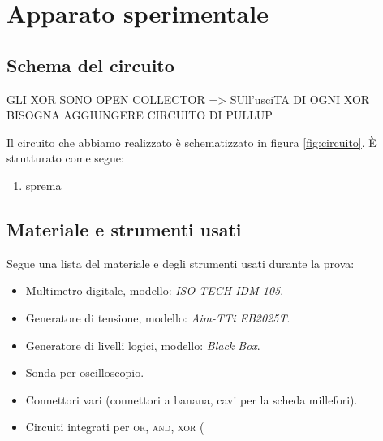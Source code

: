 \section{Apparato sperimentale}\label{sec:apparato-sperimentale}
\subsection{Schema del circuito}\label{subsec:schema-circuito}

GLI XOR SONO OPEN COLLECTOR => SUll'usciTA DI OGNI XOR BISOGNA AGGIUNGERE CIRCUITO DI PULLUP


Il circuito che abbiamo realizzato è schematizzato in figura \ref{fig:circuito}.
È strutturato come segue:
\begin{enumerate}
  \item%
  sprema %
\end{enumerate}

\subsection{Materiale e strumenti usati}\label{subsec:materiali}
Segue una lista del materiale e degli strumenti usati durante la prova:
\begin{itemize}
  \item%
  Multimetro digitale, modello: \emph{ISO-TECH IDM 105}.
  \item%
  Generatore di tensione, modello: \emph{Aim-TTi EB2025T}.
  \item%
  Generatore di livelli logici, modello: \emph{Black Box}. %
  \item%
  Sonda per oscilloscopio.
  \item%
  Connettori vari (connettori a banana, cavi per la scheda millefori).
  \item%
  Circuiti integrati per \textsc{or}, \textsc{and}, \textsc{xor} (%

\end{itemize}

